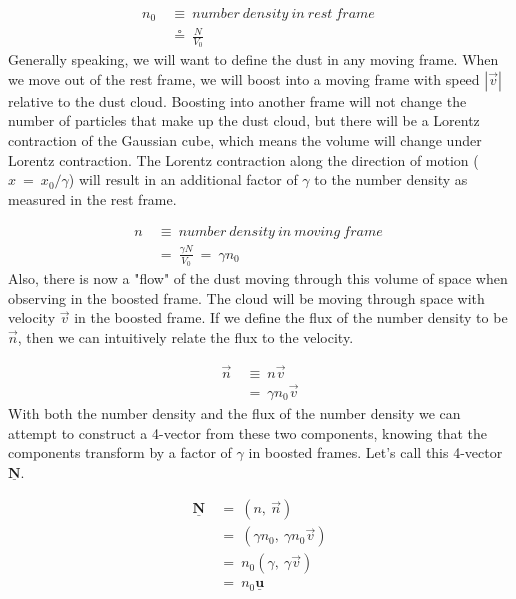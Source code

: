 \begin{equation}
  \begin{aligned}
    n_0\ &\equiv\ \mathit{number\ density\ in\ rest\ frame}\ \\
    &\circeq\ \frac{N}{V_0}
  \end{aligned}
\end{equation}
Generally speaking, we will want to define the dust in any moving frame.  When we move out of the rest frame, we will boost into a moving frame with speed $|\vec{v}|$ relative to the dust cloud.  Boosting into another frame will not change the number of particles that make up the dust cloud, but there will be a Lorentz contraction of the Gaussian cube, which means the volume will change under Lorentz contraction.  The Lorentz contraction along the direction of motion ($x\ =\ x_0/\gamma$) will result in an additional factor of $\gamma$ to the number density as measured in the rest frame.

\begin{equation}
  \begin{aligned}
    n\ &\equiv\ \mathit{number\ density\ in\ moving\ frame}\ \\
    &=\ \frac{\gamma N}{V_0}\ =\ \gamma n_0
  \end{aligned}
\end{equation}
Also, there is now a "flow" of the dust moving through this volume of space when observing in the boosted frame.  The cloud will be moving through space with velocity $\vec{v}$ in the boosted frame.  If we define the flux of the number density to be $\vec{n}$, then we can intuitively relate the flux to the velocity.

\begin{equation}
  \begin{aligned}
    \vec{n}\ &\equiv\ n\vec{v} \\
    &=\ \gamma n_0\vec{v}
  \end{aligned}
\end{equation}
With both the number density and the flux of the number density we can attempt to construct a 4-vector from these two components, knowing that the components transform by a factor of $\gamma$ in boosted frames.  Let's call this 4-vector $\underline{\mathbf{N}}$.

\begin{equation}
  \begin{aligned}
    \underline{\mathbf{N}}\ &=\ \left (n,\ \vec{n}\right ) \\
    &=\ \left (\gamma n_0,\ \gamma n_0\vec{v}\right ) \\
    &=\ n_0\left (\gamma,\ \gamma\vec{v}\right ) \\
    &=\ n_0\underline{\mathbf{u}}
  \end{aligned}
\end{equation}

